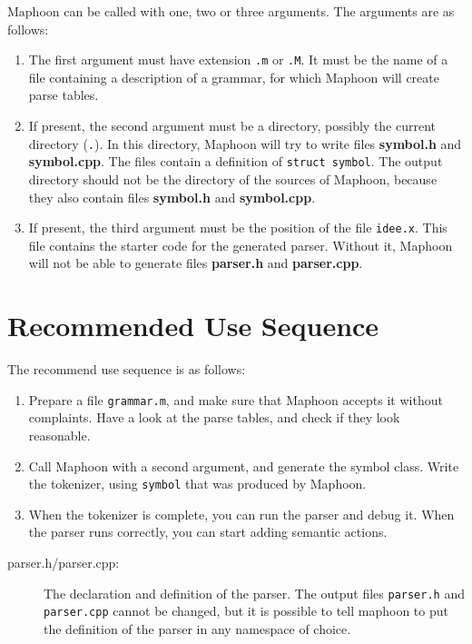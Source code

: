 \documentclass{article}
\begin{document}
Maphoon can be called with one, two or three arguments.
The arguments are as follows:
\begin{enumerate}
\item
   The first argument must have extension \verb+.m+
   or \verb+.M+. 
   It must be the name of a file containing a description of
   a grammar, for which Maphoon will create parse tables.
\item
   If present, the second argument 
   must be a directory, possibly the current
   directory (\verb+.+). In this directory, 
   Maphoon will try to write files {\bf symbol.h} 
   and {\bf symbol.cpp}. 
   The files contain a definition of \verb+struct symbol+. 
   The output directory should not be the directory
   of the sources of Maphoon, because they also contain 
   files {\bf symbol.h} and {\bf symbol.cpp}. 
\item
   If present, the third argument must be 
   the position of the file \verb+idee.x+.
   This file contains the starter code for the generated parser.
   Without it, Maphoon will not be able to
   generate files {\bf parser.h} and
   {\bf parser.cpp}. 
\end{enumerate}

\section{Recommended Use Sequence}

The recommend use sequence is as follows:
\begin{enumerate}
\item
   Prepare a file \verb+grammar.m+, and make sure that
   Maphoon accepts it without complaints.
   Have a look at the parse tables, and check
   if they look reasonable. 
\item
   Call Maphoon with a second argument, and generate the 
   symbol class. 
   Write the tokenizer, using \verb+symbol+ that was
   produced by Maphoon. 
\item
   When the tokenizer is complete, you can run the parser and debug it. 
   When the parser runs correctly,
   you can start adding semantic actions.
\end{enumerate}

\begin{description}

\item[parser.h/parser.cpp:]
   The declaration and definition of the parser. 
   The output files \verb+parser.h+ and \verb+parser.cpp+ cannot be 
   changed, but it is possible to tell maphoon to put 
   the definition of the parser in any namespace of choice. 

\end{description}
\end{document}
